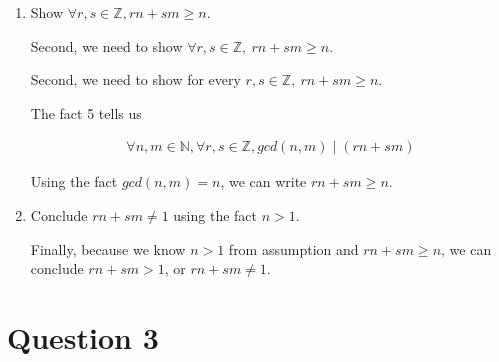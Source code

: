 \documentclass[12pt]{article}
\begin{document}
\begin{enumerate}[a.]
\begin{mdframed}
\begin{enumerate}[1.]
\begin{mdframed}
            \end{mdframed}

            \item Show $\forall r,s \in \mathbb{Z}, rn + sm \geq n$.

            \bigskip

            Second, we need to show $\forall r,s \in \mathbb{Z},\:rn + sm \geq n$.

            \bigskip

            \begin{mdframed}

                Second, we need to show for every $r,s \in \mathbb{Z},\:rn + sm \geq n$.

                \bigskip

                The fact 5 tells us

                \begin{align}
                    \forall n,m \in \mathbb{N}, \forall r,s \in \mathbb{Z}, gcd(n,m) \mid (rn + sm)
                \end{align}

                \bigskip

                Using the fact $gcd(n,m) = n$, we can write $rn + sm \geq n$.

            \end{mdframed}

            \item Conclude $rn + sm \neq 1$ using the fact $n > 1$.

            \begin{mdframed}

                Finally, because we know $n > 1$ from assumption and $rn + sm \geq n$, we can conclude $rn + sm > 1$,
                or $rn + sm \neq 1$.

            \end{mdframed}

        \end{enumerate}
    \end{mdframed}

\end{enumerate}

\section*{Question 3}
\end{document}

